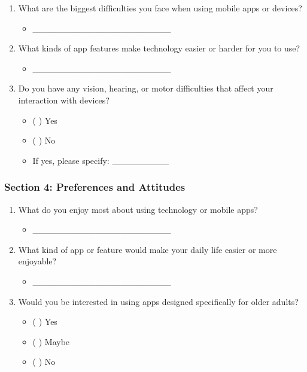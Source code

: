 \documentclass[acmlarge]{acmart}
\begin{document}
{\begin{enumerate}
    \item What are the biggest difficulties you face when using mobile apps or devices?
    \begin{itemize}
        \item \_\_\_\_\_\_\_\_\_\_\_\_\_\_\_\_\_\_\_\_\_\_
    \end{itemize}
    
    \item What kinds of app features make technology easier or harder for you to use?
    \begin{itemize}
        \item \_\_\_\_\_\_\_\_\_\_\_\_\_\_\_\_\_\_\_\_\_\_
    \end{itemize}
    
    \item Do you have any vision, hearing, or motor difficulties that affect your interaction with devices?
    \begin{itemize}
        \item ( ) Yes
        \item ( ) No
        \item If yes, please specify: \_\_\_\_\_\_\_\_\_
    \end{itemize}
\end{enumerate}

\subsubsection{Section 4: Preferences and Attitudes}
\begin{enumerate}
    \item What do you enjoy most about using technology or mobile apps?
    \begin{itemize}
        \item \_\_\_\_\_\_\_\_\_\_\_\_\_\_\_\_\_\_\_\_\_\_
    \end{itemize}
    
    \item What kind of app or feature would make your daily life easier or more enjoyable?
    \begin{itemize}
        \item \_\_\_\_\_\_\_\_\_\_\_\_\_\_\_\_\_\_\_\_\_\_
    \end{itemize}
    
    \item Would you be interested in using apps designed specifically for older adults?
    \begin{itemize}
        \item ( ) Yes
        \item ( ) Maybe
        \item ( ) No
    \end{itemize}
\end{enumerate}

}
\end{document}
